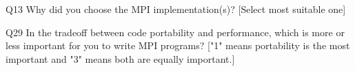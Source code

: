 \begin{description}%
\item{Q13} Why did you choose the MPI implementation(s)? [Select most suitable one]%
\item{Q29} In the tradeoff between code portability and performance, which is more or less important for you to write MPI programs? ["1" means portability is the most important and "3" means both are equally important.]%
\end{description}%
